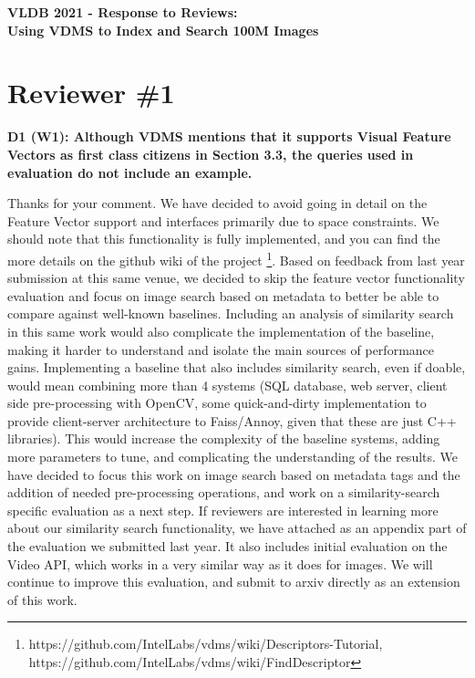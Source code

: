 \documentclass[11pt]{proposalnsf}
\begin{document}
\begin{center}
{\Large{\bf VLDB 2021 - Response to Reviews: \\
Using VDMS to Index and Search 100M Images}}

\end{center}

\section{Reviewer \#1}

\noindent %
\textbf{
D1 (W1): Although VDMS mentions that it supports Visual Feature Vectors as
first class citizens in Section 3.3, the queries used in evaluation
do not include an example.
}\bigskip

Thanks for your comment.
We have decided to avoid going in detail on the Feature Vector support
and interfaces primarily due to space constraints.
We should note that this functionality is fully implemented,
and you can find the more details on the github wiki of the project
\footnote{https://github.com/IntelLabs/vdms/wiki/Descriptors-Tutorial,
https://github.com/IntelLabs/vdms/wiki/FindDescriptor}.
Based on feedback from last year submission at this same venue, we decided
to skip the feature vector functionality evaluation and focus on image search
based on metadata to better be able to compare against well-known baselines.
Including an analysis of similarity search in this same work would also
complicate the implementation of the baseline, making it harder to understand
and isolate the main sources of performance gains.
Implementing a baseline that also includes similarity search, even if doable,
would mean combining more than 4 systems (SQL database, web server, client side
pre-processing with OpenCV, some quick-and-dirty implementation
to provide client-server architecture to Faiss/Annoy, given that these
are just C++ libraries).
This would increase the complexity of the baseline systems, adding
more parameters to tune, and complicating the understanding of the results.
We have decided to focus this work on image search based on metadata tags
and the addition of needed pre-processing operations, and
work on a similarity-search specific evaluation as a next step.
If reviewers are interested in learning more about our similarity search functionality,
we have attached as an appendix part of the evaluation we submitted last year.
It also includes initial evaluation on the Video API, which works in a very
similar way as it does for images.
We will continue to improve this evaluation, and submit to arxiv directly
as an extension of this work.
\end{document}

